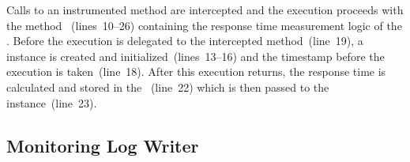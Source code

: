 
\noindent Calls to an instrumented method are intercepted and the execution %
proceeds with the method ~(lines~10--26) containing the %
response time measurement logic of the \MonitoringProbe{}. %
Before the execution is delegated to the intercepted method~(line~19), %
a \MonitoringRecord{} instance is created and initialized~(lines~13--16) %
and the timestamp before the execution is taken~(line~18). %
After this execution returns, the response time is calculated and stored in %
the \MonitoringRecord{}~(line~22) which is then passed to the \TpmonController{} %
instance~(line~23).

\subsection{Monitoring Log Writer}\label{sec:monitoringlogwriter}

